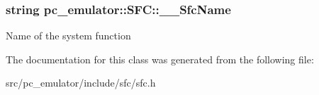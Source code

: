 \subsubsection[{\texorpdfstring{\+\_\+\+\_\+\+Sfc\+Name}{__SfcName}}]{\setlength{\rightskip}{0pt plus 5cm}string pc\+\_\+emulator\+::\+S\+F\+C\+::\+\_\+\+\_\+\+Sfc\+Name}\hypertarget{classpc__emulator_1_1SFC_a7b295e456008cbf12323a2880220b33e}{}\label{classpc__emulator_1_1SFC_a7b295e456008cbf12323a2880220b33e}
Name of the system function 

The documentation for this class was generated from the following file\+:\begin{DoxyCompactItemize}
\item 
src/pc\+\_\+emulator/include/sfc/sfc.\+h\end{DoxyCompactItemize}

